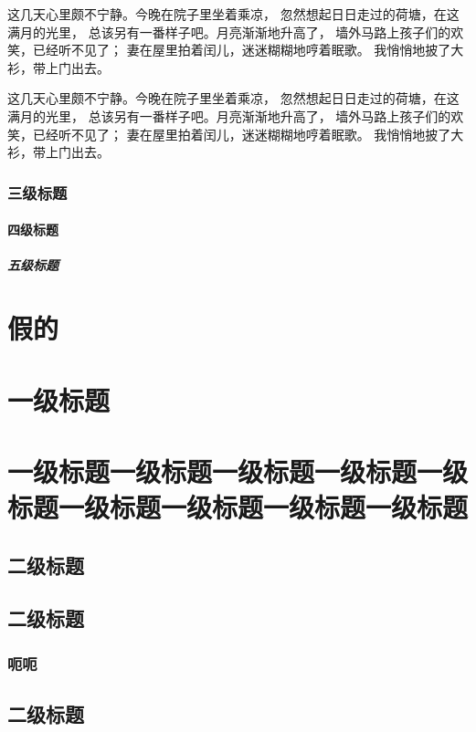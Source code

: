 \documentclass[printMode=false, declarePage=false]{ecnuthesis}
\begin{document}
这几天心里颇不宁静。今晚在院子里坐着乘凉，
忽然想起日日走过的荷塘，在这满月的光里，
总该另有一番样子吧。月亮渐渐地升高了，
墙外马路上孩子们的欢笑，已经听不见了；
妻在屋里拍着闰儿，迷迷糊糊地哼着眠歌。
我悄悄地披了大衫，带上门出去。

这几天心里颇不宁静。今晚在院子里坐着乘凉，
忽然想起日日走过的荷塘，在这满月的光里，
总该另有一番样子吧。月亮渐渐地升高了，
墙外马路上孩子们的欢笑，已经听不见了；
妻在屋里拍着闰儿，迷迷糊糊地哼着眠歌。
我悄悄地披了大衫，带上门出去。

\subsection{三级标题}

\subsubsection{四级标题}

\paragraph{五级标题}

\chapter{假的}

\chapter{一级标题}

\chapter{一级标题一级标题一级标题一级标题一级标题一级标题一级标题一级标题一级标题}

\section{二级标题}
\section{二级标题}
\subsection{呃呃}
\section{二级标题}
\end{document}
